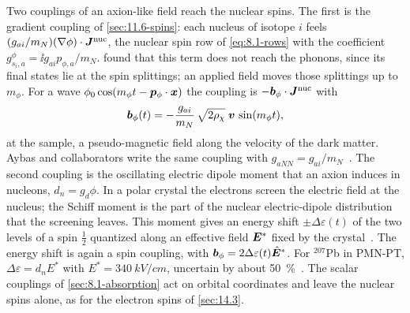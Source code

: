Two couplings of an axion-like field reach the nuclear spins. The first is the gradient coupling of \cref{sec:11.6-spins}: each nucleus of isotope $i$ feels $(g_{ai}/m_N)(\nabla\phi)\cdot\bm{J}^{\mathrm{nuc}}$, the nuclear spin row of \cref{eq:8.1-rows} with the coefficient $g^\phi_{s_i,a} = \ii g_{ai}p_{\phi,a}/m_N$.  found that this term does not reach the phonons, since its final states lie at the spin splittings; an applied field moves those splittings up to $m_\phi$. For a wave $\phi_0\cos(m_\phi t - \bm{p}_\phi\cdot\bm{x})$ the coupling is $-\bm{b}_\phi\cdot\bm{J}^{\mathrm{nuc}}$ with
\begin{equation*}
  \bm{b}_\phi(t) = -\frac{g_{ai}}{m_N}\,\sqrt{2\rho_\chi}\;\bm{v}\,\sin(m_\phi t) ,
\end{equation*}
at the sample, a pseudo-magnetic field along the velocity of the dark matter. Aybas and collaborators write the same coupling with $g_{aNN} = g_{ai}/m_N$~\cite[Eqs.~(S49)--(S53)]{aybas2021search}. The second coupling is the oscillating electric dipole moment that an axion induces in nucleons, $d_n = g_d\phi$. In a polar crystal the electrons screen the electric field at the nucleus; the Schiff moment is the part of the nuclear electric-dipole distribution that the screening leaves. This moment gives an energy shift $\pm\Delta\varepsilon(t)$ of the two levels of a spin $\frac12$ quantized along an effective field $\bm{E}^*$ fixed by the crystal~\cite{budker2014proposal}. The energy shift is again a spin coupling, with $\bm{b}_\phi = 2\Delta\varepsilon(t)\hat{\bm{E}}^*$. For $^{207}$Pb in PMN-PT, $\Delta\varepsilon = d_nE^*$ with $E^* = \SI{340}{kV/cm}$, uncertain by about \SI{50}{\percent}~\cite[Eqs.~(S44), (S45)]{aybas2021search}. The scalar couplings of \cref{sec:8.1-absorption} act on orbital coordinates and leave the nuclear spins alone, as for the electron spins of \cref{sec:14.3}.


